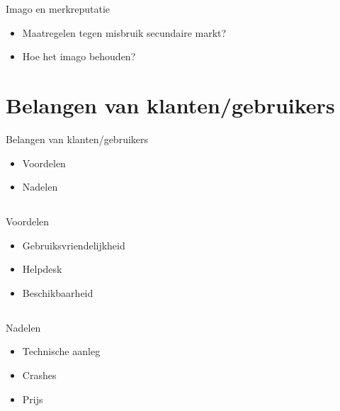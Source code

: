 \documentclass{beamer}
\begin{document}
\begin{frame}{Imago en merkreputatie}
    \begin{itemize}
        \item Maatregelen tegen misbruik secundaire markt?
        \item Hoe het imago behouden?
    \end{itemize}
\end{frame}


\section[Klant]{Belangen van klanten/gebruikers}
\begin{frame}{Belangen van klanten/gebruikers}
    \begin{itemize}
        \item Voordelen 
        \item Nadelen
    \end{itemize} 
\end{frame}
    \subsection{}
    \begin{frame}{Voordelen}
        \begin{itemize}
            \item Gebruiksvriendelijkheid
            \item Helpdesk
            \item Beschikbaarheid
        \end{itemize}
    \end{frame}
            
    \subsection{}
    \begin{frame}{Nadelen}
        \begin{itemize}
            \item Technische aanleg
            \item Crashes
            \item Prijs
        \end{itemize}
    \end{frame}
    
\end{document}
